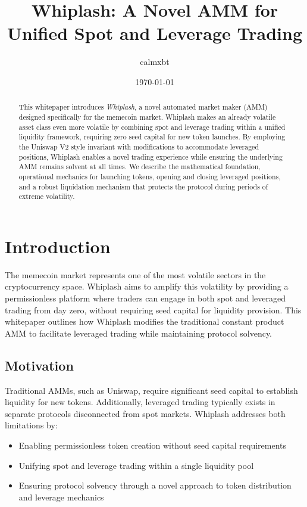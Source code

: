 \documentclass[11pt]{article}
\title{\textbf{Whiplash: A Novel AMM for Unified Spot and Leverage Trading}}
\author{calmxbt}
\date{\today}
\begin{document}
\maketitle

\begin{abstract}
This whitepaper introduces \emph{Whiplash}, a novel automated market maker (AMM) designed specifically for the memecoin market. Whiplash makes an already volatile asset class even more volatile by combining spot and leverage trading within a unified liquidity framework, requiring zero seed capital for new token launches. By employing the Uniswap V2 style invariant with modifications to accommodate leveraged positions, Whiplash enables a novel trading experience while ensuring the underlying AMM remains solvent at all times. We describe the mathematical foundation, operational mechanics for launching tokens, opening and closing leveraged positions, and a robust liquidation mechanism that protects the protocol during periods of extreme volatility.
\end{abstract}

\section{Introduction}

The memecoin market represents one of the most volatile sectors in the cryptocurrency space. Whiplash aims to amplify this volatility by providing a permissionless platform where traders can engage in both spot and leveraged trading from day zero, without requiring seed capital for liquidity provision. This whitepaper outlines how Whiplash modifies the traditional constant product AMM to facilitate leveraged trading while maintaining protocol solvency.

\subsection{Motivation}
Traditional AMMs, such as Uniswap, require significant seed capital to establish liquidity for new tokens. Additionally, leveraged trading typically exists in separate protocols disconnected from spot markets. Whiplash addresses both limitations by:
\begin{itemize}
    \item Enabling permissionless token creation without seed capital requirements
    \item Unifying spot and leverage trading within a single liquidity pool
    \item Ensuring protocol solvency through a novel approach to token distribution and leverage mechanics
\end{itemize}
\end{document}
